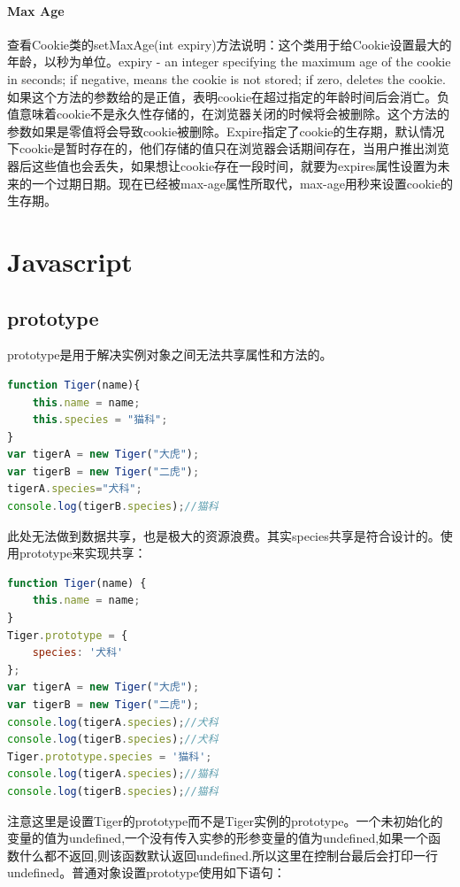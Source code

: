 \documentclass[letter]{book}
\begin{document}
\paragraph{Max Age}查看Cookie类的setMaxAge(int expiry)方法说明：这个类用于给Cookie设置最大的年龄，以秒为单位。expiry - an integer specifying the maximum age of the cookie in seconds; if negative, means the cookie is not stored; if zero, deletes the cookie.如果这个方法的参数给的是正值，表明cookie在超过指定的年龄时间后会消亡。负值意味着cookie不是永久性存储的，在浏览器关闭的时候将会被删除。这个方法的参数如果是零值将会导致cookie被删除。Expire指定了cookie的生存期，默认情况下cookie是暂时存在的，他们存储的值只在浏览器会话期间存在，当用户推出浏览器后这些值也会丢失，如果想让cookie存在一段时间，就要为expires属性设置为未来的一个过期日期。现在已经被max-age属性所取代，max-age用秒来设置cookie的生存期。

\section{Javascript}

\subsection{prototype}

prototype是用于解决实例对象之间无法共享属性和方法的。

\begin{lstlisting}[language=Javascript]
function Tiger(name){
	this.name = name;
	this.species = "猫科";
}
var tigerA = new Tiger("大虎");
var tigerB = new Tiger("二虎");
tigerA.species="犬科";
console.log(tigerB.species);//猫科
\end{lstlisting}

此处无法做到数据共享，也是极大的资源浪费。其实species共享是符合设计的。使用prototype来实现共享：

\begin{lstlisting}[language=Javascript]
function Tiger(name) {
	this.name = name;
}
Tiger.prototype = {
	species: '犬科'
};
var tigerA = new Tiger("大虎");
var tigerB = new Tiger("二虎");
console.log(tigerA.species);//犬科
console.log(tigerB.species);//犬科
Tiger.prototype.species = '猫科';
console.log(tigerA.species);//猫科
console.log(tigerB.species);//猫科
\end{lstlisting}

注意这里是设置Tiger的prototype而不是Tiger实例的prototype。一个未初始化的变量的值为undefined,一个没有传入实参的形参变量的值为undefined,如果一个函数什么都不返回,则该函数默认返回undefined.所以这里在控制台最后会打印一行undefined。普通对象设置prototype使用如下语句：
\end{document}
